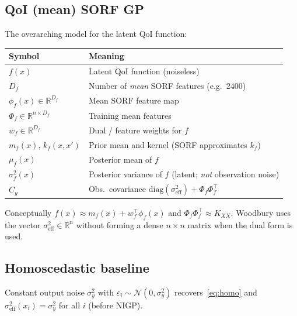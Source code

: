 \documentclass[11pt]{article}
\newcommand{\sigy}{\sigma_{y}^{2}}%
\newcommand{\sigeff}{\sigma_{\mathrm{eff}}^{2}}%
\newcommand{\Phif}{\Phi_{f}}%
\newcommand{\Cy}{C_{y}}%
\begin{document}
\subsection{QoI (mean) SORF GP}
The overarching model for the latent QoI function:
\begin{center}
\small
\begin{tabularx}{\textwidth}{@{}>{\raggedright\arraybackslash}p{}
  >{\raggedright\arraybackslash}X@{}}
\toprule
\textbf{Symbol} & \textbf{Meaning} \\
\midrule
$f(x)$ & Latent QoI function (noiseless) \\
$D_f$ & Number of \emph{mean} SORF features (e.g.\ $2400$) \\
$\phi_f(x)\in\mathbb{R}^{D_f}$ & Mean SORF feature map \\
$\Phif\in\mathbb{R}^{n\times D_f}$ & Training mean features \\
$w_f\in\mathbb{R}^{D_f}$ & Dual / feature weights for $f$ \\
$m_f(x)$, $k_f(x,x')$ & Prior mean and kernel (SORF approximates $k_f$) \\
$\mu_f(x)$ & Posterior mean of $f$ \\
$\sigma_f^{2}(x)$ & Posterior variance of $f$ (latent; \emph{not} observation noise) \\
$\Cy$ & Obs.\ covariance $\mathrm{diag}(\sigeff)+\Phif\Phif^{\top}$ \\
\bottomrule
\end{tabularx}
\end{center}
Conceptually $f(x)\approx m_f(x)+w_f^{\top}\phi_f(x)$ and $\Phif\Phif^{\top}\approx K_{XX}$.
Woodbury uses the vector $\sigeff\in\mathbb{R}^{n}$ without forming a dense $n\times n$ matrix
when the dual form is used.

\subsection{Homoscedastic baseline}
Constant output noise $\sigy$ with $\varepsilon_i\sim\mathcal N(0,\sigy)$ recovers~\eqref{eq:homo}
and $\sigeff(x_i)=\sigy$ for all $i$ (before NIGP).
\end{document}
